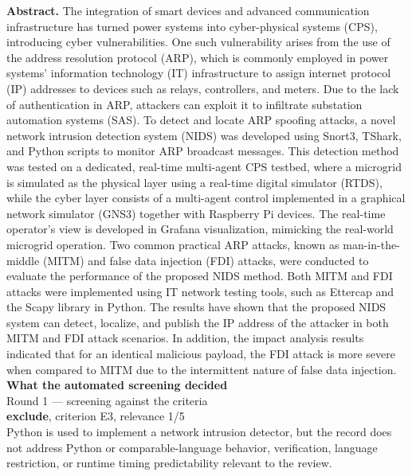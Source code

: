 \documentclass[11pt,a4paper]{article}
\begin{document}
{\small\textbf{Abstract.} The integration of smart devices and advanced communication infrastructure has turned power systems into cyber-physical systems (CPS), introducing cyber vulnerabilities. One such vulnerability arises from the use of the address resolution protocol (ARP), which is commonly employed in power systems' information technology (IT) infrastructure to assign internet protocol (IP) addresses to devices such as relays, controllers, and meters. Due to the lack of authentication in ARP, attackers can exploit it to infiltrate substation automation systems (SAS). To detect and locate ARP spoofing attacks, a novel network intrusion detection system (NIDS) was developed using Snort3, TShark, and Python scripts to monitor ARP broadcast messages. This detection method was tested on a dedicated, real-time multi-agent CPS testbed, where a microgrid is simulated as the physical layer using a real-time digital simulator (RTDS), while the cyber layer consists of a multi-agent control implemented in a graphical network simulator (GNS3) together with Raspberry Pi devices. The real-time operator's view is developed in Grafana visualization, mimicking the real-world microgrid operation. Two common practical ARP attacks, known as man-in-the-middle (MITM) and false data injection (FDI) attacks, were conducted to evaluate the performance of the proposed NIDS method. Both MITM and FDI attacks were implemented using IT network testing tools, such as Ettercap and the Scapy library in Python. The results have shown that the proposed NIDS system can detect, localize, and publish the IP address of the attacker in both MITM and FDI attack scenarios. In addition, the impact analysis results indicated that for an identical malicious payload, the FDI attack is more severe when compared to MITM due to the intermittent nature of false data injection.}
\vspace{3mm}
\vspace{2.5mm}
{\small\textbf{What the automated screening decided}}\\[2mm]
{\footnotesize\color{soft}Round 1 --- screening against the criteria}\\[0.5mm]
{\small\textbf{exclude}, criterion E3, relevance 1/5}\\[0.5mm]
{\small Python is used to implement a network intrusion detector, but the record does not address Python or comparable-language behavior, verification, language restriction, or runtime timing predictability relevant to the review.}\\[2.5mm]
\end{document}
